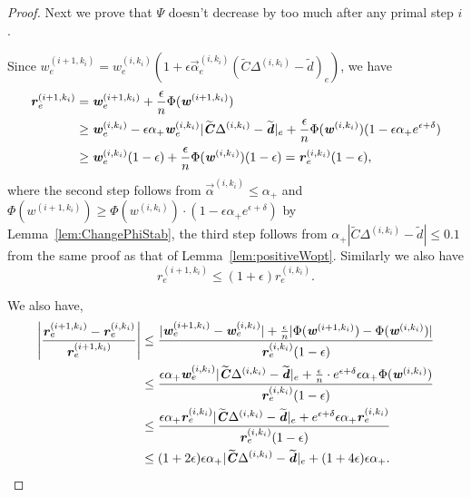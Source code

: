 \documentclass[11pt]{article}
\let\originalleft\left
\let\originalright\right
\renewcommand{\left}{\mathopen{}\mathclose\bgroup\originalleft}
\renewcommand{\right}{\aftergroup\egroup\originalright}
\newcommand\dd{\boldsymbol{\mathit{d}}}
\newcommand\rr{\boldsymbol{\mathit{r}}}
\newcommand\ww{\boldsymbol{\mathit{w}}}
\newcommand\CC{\boldsymbol{\mathit{C}}}
\newcommand{\wt}{\widetilde}
\begin{document}
\begin{proof}
 Next we prove that $\Psi$ doesn't decrease by too much after any primal step $i$.

Since $\ww_e^{(i+1,k_i)} = \ww_e^{(i,k_i)}(1+\epsilon\overrightarrow{\alpha}_e^{(i,k_i)} (\wt{\CC}\Delta^{(i,k_i)}-\wt{\dd})_e)$, we have
\begin{align}\label{eq:Psi_primal_re}
\rr_e^{(i+1,k_i)} & = \ww_e^{(i+1,k_i)} + \frac{\epsilon}{n}\Phi(\ww^{(i+1,k_i)}) \notag \\
&\geq \ww_e^{(i,k_i)} -  \epsilon\alpha_+ \ww^{(i,k_i)}_e |\wt{\CC}\Delta^{(i,k_i)}-\wt{\dd}|_e + \frac{\epsilon}{n} \Phi(\ww^{(i,k_i)}) (1-\epsilon\alpha_+ e^{\epsilon+\delta}) \notag \\
& \geq \ww^{(i,k_i)}_e (1-\epsilon) + \frac{\epsilon}{n} \Phi(\ww^{(i,k_i)}) (1-\epsilon) = \rr^{(i,k_i)}_e (1-\epsilon),
\end{align}
where the second step follows from $\overrightarrow{\alpha}^{(i,k_i)} \leq \alpha_+$ and $\Phi(\ww^{(i+1,k_i)}) \geq \Phi(\ww^{(i,k_i)}) \cdot (1-\epsilon\alpha_+ e^{\epsilon+\delta})$ by Lemma~\ref{lem:ChangePhiStab}, the third step follows from $\alpha_+ |\wt{\CC} \Delta^{(i,k_i)} - \wt{\dd}| \leq 0.1$ from the same proof as that of Lemma~\ref{lem:positiveWopt}. 
Similarly we also have
\begin{equation}\label{eq:Psi_primal_re_UB}
\rr_e^{(i+1,k_i)} \leq (1 + \epsilon) \rr_e^{(i,k_i)}.
\end{equation}


We also have,
\begin{align}\label{eq:Psi_primal_re_diff}
    \left|\frac{\rr_e^{(i+1,k_i)}-\rr_e^{(i,k_i)}}{\rr_e^{(i+1,k_i)}}\right| & \leq \frac{|\ww_e^{(i+1,k_i)}-\ww_e^{(i,k_i)}| + \frac{\epsilon}{n}|\Phi(\ww^{(i+1,k_i)})-\Phi(\ww^{(i,k_i)})|}{\rr_e^{(i,k_i)} (1-\epsilon)} \notag \\
    & \leq \frac{\epsilon \alpha_+ \ww_e^{(i,k_i)} |\wt{\CC}\Delta^{(i,k_i)}-\wt{\dd}|_e + \frac{\epsilon}{n}\cdot e^{\epsilon+\delta} \epsilon\alpha_+ \Phi(\ww^{(i,k_i)})}{\rr^{(i,k_i)}_e (1-\epsilon)} \notag \\
    & \leq \frac{\epsilon \alpha_+ \rr^{(i,k_i)}_e|\wt{\CC}\Delta^{(i,k_i)}-\wt{\dd}|_e + e^{\epsilon+\delta} \epsilon\alpha_+\rr^{(i,k_i)}_e}{\rr^{(i,k_i)}_e (1-\epsilon)} \notag \\
    & \leq (1+2\epsilon)\epsilon\alpha_+ |\wt{\CC}\Delta^{(i,k_i)}-\wt{\dd}|_e + (1+4\epsilon)\epsilon\alpha_+. 
\end{align}


\end{proof}
\end{document}
